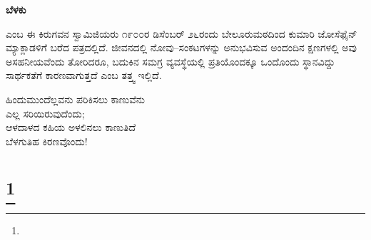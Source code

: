 \selectkan

\begin{center}
\textbf{ಬೆಳಕು}
\end{center}

 ಎಂಬ ಈ ಕಿರುಗವನ ಸ್ವಾಮಿಜಿಯರು ೧೯೦೦ರ ಡಿಸೆಂಬರ್ ೨೬ರಂದು ಬೇಲೂರುಮಠದಿಂದ ಕುಮಾರಿ ಜೋಸೆಫೈನ್ ಮ್ಯಾಕ್ಲಾಡಳಿಗೆ ಬರೆದ ಪತ್ರದಲ್ಲಿದೆ. ಜೀವನದಲ್ಲಿ ನೋವು–ಸಂಕಟಗಳನ್ನು ಅನುಭವಿಸುವ ಅಂದಂದಿನ ಕ್ಷಣಗಳಲ್ಲಿ ಅವು ಅಸಹನೀಯವೆಂದು ತೋರಿದರೂ, ಬದುಕಿನ ಸಮಗ್ರ ವ್ಯವಸ್ಥೆಯಲ್ಲಿ ಪ್ರತಿಯೊಂದಕ್ಕೂ ಒಂದೊಂದು ಸ್ಥಾನವಿದ್ದು ಸಾರ್ಥಕತೆಗೆ ಕಾರಣವಾಗುತ್ತದೆ ಎಂಬ ತತ್ತ್ವ ಇಲ್ಲಿದೆ.

\begin{myquote}
ಹಿಂದುಮುಂದೆಲ್ಲವನು ಪರಿಕಿಸಲು ಕಾಣುವೆನು\\ಎಲ್ಲ ಸರಿಯಿರುವುದೆಂದು;\\ಆಳದಾಳದ ಕಹಿಯ ಅಳಲಿನಲು ಕಾಣುತಿದೆ\\ಬೆಳಗುತಿಹ ಕಿರಣವೊಂದು!
\end{myquote}

\selecteng

\chapter[THE LIVING GOD]{\protect\footnote{}}

\begin{myquote}
\end{myquote}

\begin{myquote}
\end{myquote}

\begin{myquote}
\end{myquote}

